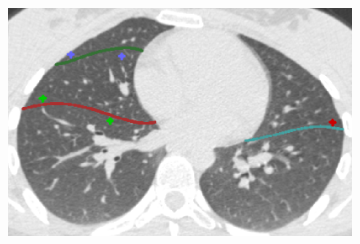 {\begin{figure}[htbp] 
\centering
\begin{subfigure}{.49\linewidth}%
  \includegraphics[width=\linewidth,trim={{.0\wd0} {.0\wd0} {.0\wd0} {.0\wd0}},clip]{Segmentation/Image/BeforeManualCorrection.png}
  \caption{}
  \label{fig:ManualCorrection-a} 
\end{subfigure}
\vspace{.1in} %
\begin{subfigure}{.49\linewidth}%

\end{subfigure}
\end{figure}}
